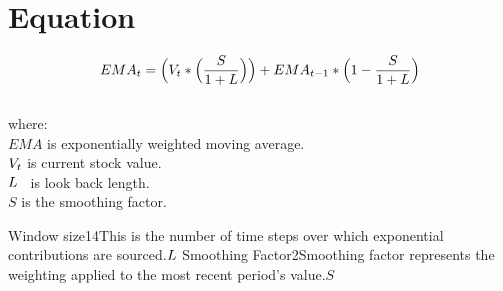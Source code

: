 \documentclass{article}
\begin{document}
\logo
{} %
\tblofcontents


\section{Equation}
\begin{equation}
    EMA_{t} = \Big(V_{t} * \Big(\frac{S}{1 + L}\Big)\Big) + EMA_{t-1} * \Big(1-\frac{S}{1 + L}\Big)
\end{equation}
\\

where: \\

$EMA$ is exponentially weighted moving average. \\

$V_{t}$ is current stock value. \\

$L$ \ is look back length. \\

$S$ is the smoothing factor.


{Window size}{14}{This is the number of time steps over which exponential contributions are sourced.}{$L$}
{Smoothing Factor}{2}{Smoothing factor represents the weighting applied to the most recent period’s value.}{$S$}
\stoptable

\keyterms
\furtherlinks
\end{document}
